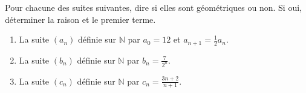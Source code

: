 \documentclass[11pt]{article}
\begin{document}
\begin{app}
  Pour chacune des suites suivantes, dire si elles sont géométriques ou non. Si
  oui, déterminer la raison et le premier terme.
  \begin{enumerate}
    \item La suite $\left( a_n \right)$ définie sur $\mathbb{N}$ par $a_0=12$ et
      $a_{n+1} = \frac{1}{2}a_n$.
    \item La suite $\left( b_n \right)$ définie sur $\mathbb{N}$ par $b_n =
      \frac{7}{2^n}$.
    \item La suite $\left( c_n \right)$ définie sur $\mathbb{N}$ par $c_n =
      \frac{3n+2}{n+1}$.
  \end{enumerate}
\end{app}
\end{document}
